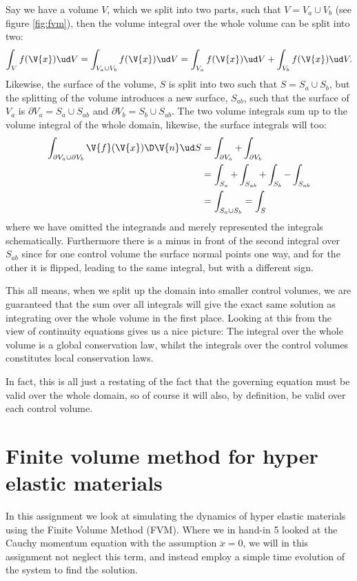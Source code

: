 \documentclass[sigconf]{acmart}
\begin{document}
Say we have a volume $ V $, which we split into two parts, such that $ V= V_a\cup V_b$ (see figure \ref{fig:fvm}), then the volume integral over the whole volume can be split into two:
\begin{equation*}\label{key}
	\int_{V} f(\V{x}) \ud V = \int_{V_a \cup V_b} f(\V{x}) \ud V = \int_{V_a}f(\V{x}) \ud V + \int_{V_b} f(\V{x}) \ud V.
\end{equation*}
Likewise, the surface of the volume, $ S $ is split into two such that $ S = S_a \cup S_b $, but the splitting of the volume introduces a new surface, $ S_{ab} $, such that the surface of $ V_a $ is $ \partial V_a = S_a \cup S_{ab} $ and $ \partial V_b = S_b \cup S_{ab} $. The two volume integrals sum up to the volume integral of the whole domain, likewise, the surface integrals will too:
\begin{align*}\label{key}
	\int_{\partial V_a \cup \partial V_b} \V{f}(\V{x})\D \V{n} \ud S &= \int_{\partial V_a}  + \int_{\partial V_b}  \\
	&= \int_{S_a}+\int_{S_{ab}}+\int_{S_b} - \int_{S_{ab}}\\
	&= \int_{S_a\cup S_b} = \int_S 
\end{align*}
where we have omitted the integrands and merely represented the integrals schematically. Furthermore there is a minus in front of the second integral over $ S_{ab} $ since for one control volume the surface normal points one way, and for the other it is flipped, leading to the same integral, but with a different sign.


This all means, when we split up the domain into smaller control volumes, we are guaranteed that the sum over all integrals will give the exact same solution as integrating over the whole volume in the first place. Looking at this from the view of continuity equations gives us a nice picture: The integral over the whole volume is a global conservation law, whilst the integrals over the control volumes constitutes local conservation laws.

In fact, this is all just a restating of the fact that the governing equation must be valid over the whole domain, so of course it will also, by definition, be valid over each control volume.

\section{Finite volume method for hyper elastic materials}
In this assignment we look at simulating the dynamics of hyper elastic materials using the Finite Volume Method (FVM). Where we in hand-in 5 looked at the Cauchy momentum equation with the assumption $ \ddot{x}=0 $, we will in this assignment not neglect this term, and instead employ a simple time evolution of the system to find the solution.
\end{document}
